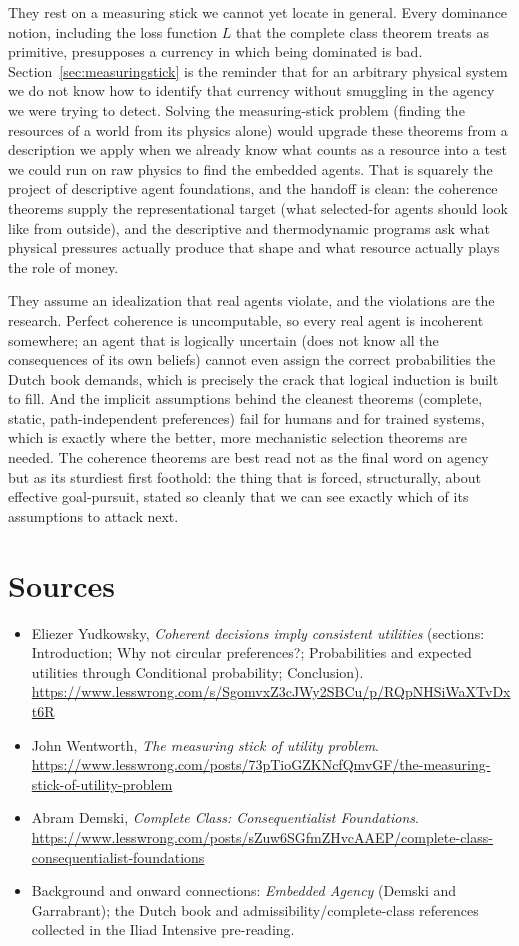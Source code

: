 \documentclass[10pt]{article}
\theoremstyle{definition}
\theoremstyle{remark}
\begin{document}
They rest on a measuring stick we cannot yet locate in general. Every dominance notion, including the loss function $L$ that the complete class theorem treats as primitive, presupposes a currency in which being dominated is bad. Section~\ref{sec:measuringstick} is the reminder that for an arbitrary physical system we do not know how to identify that currency without smuggling in the agency we were trying to detect. Solving the measuring-stick problem (finding the resources of a world from its physics alone) would upgrade these theorems from a description we apply when we already know what counts as a resource into a test we could run on raw physics to find the embedded agents. That is squarely the project of descriptive agent foundations, and the handoff is clean: the coherence theorems supply the representational target (what selected-for agents should look like from outside), and the descriptive and thermodynamic programs ask what physical pressures actually produce that shape and what resource actually plays the role of money.

They assume an idealization that real agents violate, and the violations are the research. Perfect coherence is uncomputable, so every real agent is incoherent somewhere; an agent that is logically uncertain (does not know all the consequences of its own beliefs) cannot even assign the correct probabilities the Dutch book demands, which is precisely the crack that logical induction is built to fill. And the implicit assumptions behind the cleanest theorems (complete, static, path-independent preferences) fail for humans and for trained systems, which is exactly where the better, more mechanistic selection theorems are needed. The coherence theorems are best read not as the final word on agency but as its sturdiest first foothold: the thing that is forced, structurally, about effective goal-pursuit, stated so cleanly that we can see exactly which of its assumptions to attack next.

\section*{Sources}

\begin{itemize}[leftmargin=1.5em]
\item Eliezer Yudkowsky, \emph{Coherent decisions imply consistent utilities} (sections: Introduction; Why not circular preferences?; Probabilities and expected utilities through Conditional probability; Conclusion). \url{https://www.lesswrong.com/s/SgomvxZ3cJWy2SBCu/p/RQpNHSiWaXTvDxt6R}
\item John Wentworth, \emph{The measuring stick of utility problem}. \url{https://www.lesswrong.com/posts/73pTioGZKNcfQmvGF/the-measuring-stick-of-utility-problem}
\item Abram Demski, \emph{Complete Class: Consequentialist Foundations}. \url{https://www.lesswrong.com/posts/sZuw6SGfmZHvcAAEP/complete-class-consequentialist-foundations}
\item Background and onward connections: \emph{Embedded Agency} (Demski and Garrabrant); the Dutch book and admissibility/complete-class references collected in the Iliad Intensive pre-reading.
\end{itemize}
\end{document}
